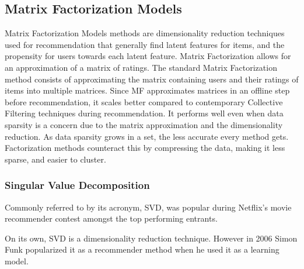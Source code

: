 \subsection{Matrix Factorization Models} \label{bg:sub:factorizationmodels}
Matrix Factorization Models methods are dimensionality reduction techniques used for recommendation that generally find latent features for items, and the propensity for users towards each latent feature.
Matrix Factorization allows for an approximation of a matrix of ratings. The standard Matrix Factorization method consists of approximating the matrix containing users and their ratings of items into multiple matrices.
Since MF approximates matrices in an offline step before recommendation, it scales better compared to contemporary Collective Filtering techniques during recommendation. It performs well even when data sparsity is a concern due to the matrix approximation and the dimensionality reduction.
As data sparsity grows in a set, the less accurate every method gets. Factorization methods counteract this by compressing the data, making it less sparse, and easier to cluster.


\subsubsection{Singular Value Decomposition}
Commonly referred to by its acronym, SVD, was popular during Netflix's movie recommender contest amongst the top performing entrants.

On its own, SVD is a dimensionality reduction technique. However in 2006 Simon Funk popularized it as a recommender method when he used it as a learning model.

